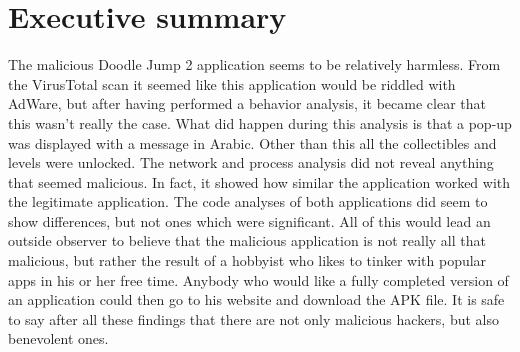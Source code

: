 \section*{Executive summary}

The malicious Doodle Jump 2 application seems to be relatively harmless.
From the VirusTotal scan it seemed like this application would be riddled with AdWare, but after having performed a behavior analysis, it became clear that this wasn’t really the case.
What did happen during this analysis is that a pop-up was displayed with a message in Arabic.
Other than this all the collectibles and levels were unlocked.
The network and process analysis did not reveal anything that seemed malicious.
In fact, it showed how similar the application worked with the legitimate application.
The code analyses of both applications did seem to show differences, but not ones which were significant.
All of this would lead an outside observer to believe that the malicious application is not really all that malicious, but rather the result of a hobbyist who likes to tinker with popular apps in his or her free time.
Anybody who would like a fully completed version of an application could then go to his website and download the APK file.
It is safe to say after all these findings that there are not only malicious hackers, but also benevolent ones.